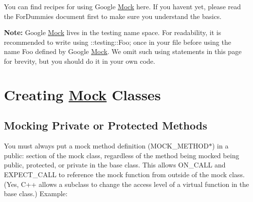 You can find recipes for using Google \mbox{\hyperlink{class_mock}{Mock}} here. If you haven\textquotesingle{}t yet, please read the For\+Dummies document first to make sure you understand the basics.

{\bfseries{Note\+:}} Google \mbox{\hyperlink{class_mock}{Mock}} lives in the {\ttfamily testing} name space. For readability, it is recommended to write {\ttfamily using \+::testing\+::\+Foo;} once in your file before using the name {\ttfamily Foo} defined by Google \mbox{\hyperlink{class_mock}{Mock}}. We omit such {\ttfamily using} statements in this page for brevity, but you should do it in your own code.

\section*{Creating \mbox{\hyperlink{class_mock}{Mock}} Classes}

\subsection*{Mocking Private or Protected Methods}

You must always put a mock method definition ({\ttfamily M\+O\+C\+K\+\_\+\+M\+E\+T\+H\+O\+D$\ast$}) in a {\ttfamily public\+:} section of the mock class, regardless of the method being mocked being {\ttfamily public}, {\ttfamily protected}, or {\ttfamily private} in the base class. This allows {\ttfamily O\+N\+\_\+\+C\+A\+LL} and {\ttfamily E\+X\+P\+E\+C\+T\+\_\+\+C\+A\+LL} to reference the mock function from outside of the mock class. (Yes, C++ allows a subclass to change the access level of a virtual function in the base class.) Example\+:


\begin{DoxyCode}{0}
\DoxyCodeLine{}
\DoxyCodeLine{}
\DoxyCodeLine{\};}
\DoxyCodeLine{}
\DoxyCodeLine{}
\DoxyCodeLine{\};}
\end{DoxyCode}


